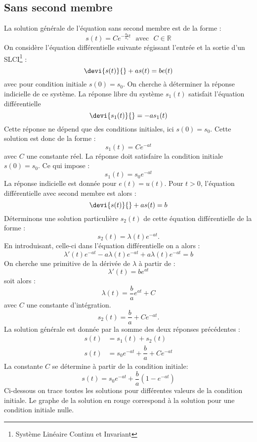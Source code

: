 \subsection{Sans second membre}
La solution générale de l'équation sans second membre est de la forme :
\[
s(t) = C e^{-\frac{a_0}{a_1}t}\,\,\,\,\text{avec}\,\,\,\,C\in\mathbb{R}
\]
On considère l'équation différentielle suivante régissant l'entrée
et la sortie d'un SLCI\footnote{Système Linéaire Continu et Invariant} :
\[
\devi{s(t)}{}+as(t)=be(t)
\]
avec pour condition initiale $s(0)=s_0$.
On cherche à déterminer la réponse indicielle de ce système.
La réponse libre du système $s_1(t)$ satisfait l'équation différentielle
\[
\devi{s_1(t)}{}=-as_1(t)
\]
Cette réponse ne dépend que des conditions initiales, ici $s(0)=s_0$.
Cette solution est donc de la forme :
\[
s_1(t)=Ce^{-at}
\]
avec $C$ une constante réel. La réponse doit satisfaire la condition 
initiale $s(0)=s_0$. Ce qui impose :
\[
s_1(t)=s_0e^{-at}
\]
La réponse indicielle est donnée pour $e(t)=u(t)$. Pour $t>0$, l'équation 
différentielle avec second membre est alors :
\[
\devi{s(t)}{}+as(t)=b
\]
Déterminons une solution particulière $s_2(t)$ de cette équation 
différentielle de la forme :
\[
s_2(t)=\lambda(t)e^{-at}.
\]
En introduisant, celle-ci dans l'équation différentielle on a alors :
\[
\lambda'(t)e^{-at}-a\lambda(t)e^{-at}+a\lambda(t)e^{-at}=b
\]
On cherche une primitive de la dérivée de $\lambda$ à partir de :
\[
\lambda'(t)=be^{at}
\]
soit alors :
\[
\lambda(t)=\dfrac{b}{a}e^{at}+C
\]
avec $C$ une constante d'intégration.
\[
s_2(t)=\dfrac{b}{a}+Ce^{-at}.
\]
La solution générale est donnée par la somme des deux réponses précédentes :
\begin{align*}
    s(t)&=s_1(t)+s_2(t)\\
    s(t)&=s_0e^{-at}+\dfrac{b}{a}+Ce^{-at}
\end{align*}
La constante $C$ se détermine à partir de la condition initiale:
\[
s(t)=s_0e^{-at}+\dfrac{b}{a}\left(1-e^{-at}\right)
\]
Ci-dessous on trace toutes les solutions pour différentes valeurs de la 
condition initiale. Le graphe de la solution en rouge correspond à la solution
pour une condition initiale nulle.
